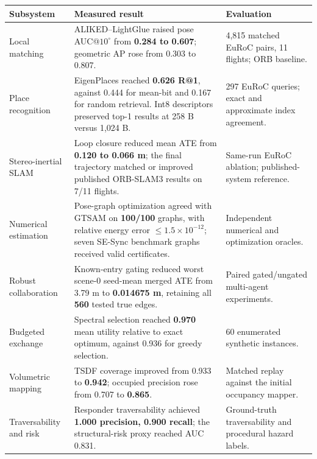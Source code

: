 \documentclass[10pt,a4paper]{article}
\renewcommand{\arraystretch}{1.12}
\begin{document}
\begin{table}[t]
\centering
\footnotesize
\setlength{\tabcolsep}{4pt}
\renewcommand{\arraystretch}{1.15}
\begin{tabular}{@{}P{2.4cm}P{9.65cm}P{3.75cm}@{}}
\toprule
\textbf{Subsystem} & \textbf{Measured result} & \textbf{Evaluation} \\
\midrule

Local matching &
ALIKED--LightGlue raised pose AUC@$10^\circ$ from
\textbf{0.284 to 0.607}; geometric AP rose from 0.303 to 0.807.
&
4,815 matched EuRoC pairs, 11 flights; ORB baseline.
\\

Place recognition &
EigenPlaces reached \textbf{0.626 R@1}, against 0.444 for mean-bit
and 0.167 for random retrieval. Int8 descriptors preserved
top-1 results at 258 B versus 1,024 B.
&
297 EuRoC queries; exact and approximate index agreement.
\\

Stereo-inertial SLAM &
Loop closure reduced mean ATE from \textbf{0.120 to 0.066 m};
the final trajectory matched or improved published ORB-SLAM3
results on 7/11 flights.
&
Same-run EuRoC ablation; published-system reference.
\\

Numerical estimation &
Pose-graph optimization agreed with GTSAM on
\textbf{100/100} graphs, with relative energy error
$\leq1.5\times10^{-12}$; seven SE-Sync benchmark
graphs received valid certificates.
&
Independent numerical and optimization oracles.
\\

Robust collaboration &
Known-entry gating reduced worst scene-0 seed-mean
merged ATE from 3.79 m to \textbf{0.014675 m},
retaining all \textbf{560} tested true edges.
&
Paired gated/ungated multi-agent experiments.
\\

Budgeted exchange &
Spectral selection reached \textbf{0.970} mean
utility relative to exact optimum, against 0.936
for greedy selection.
&
60 enumerated synthetic instances.
\\

Volumetric mapping &
TSDF coverage improved from 0.933 to
\textbf{0.942}; occupied precision rose from
0.707 to \textbf{0.865}.
&
Matched replay against the initial occupancy mapper.
\\

Traversability and risk &
Responder traversability achieved
\textbf{1.000 precision, 0.900 recall};
the structural-risk proxy reached AUC 0.831.
&
Ground-truth traversability and procedural hazard labels.
\\


\end{tabular}
\end{table}
\end{document}
